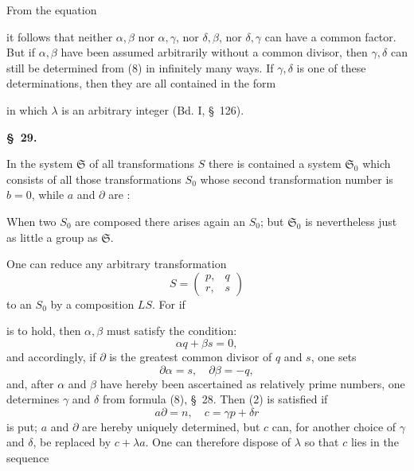 
From the equation


it follows that neither $\alpha, \beta$ nor $\alpha, \gamma$, nor $\delta, \beta$, nor $\delta, \gamma$ can have a common factor. But if $\alpha, \beta$ have been assumed arbitrarily without a common divisor, then $\gamma, \delta$ can still be determined from (8) in infinitely many ways. If $\gamma, \delta$ is one of these determinations, then they are all contained in the form


in which $\lambda$ is an arbitrary integer (Bd. I, \S\ 126).

\begin{center}
\textbf{\S\ 29.\quad{}}
\end{center}

In the system $\mathfrak{S}$ of all transformations $S$ there is contained a system $\mathfrak{S}_0$ which consists of all those transformations $S_0$ whose second transformation number is $b = 0$, while $a$ and $\partial$ are :


When two $S_0$ are composed there arises again an $S_0$; but $\mathfrak{S}_0$ is nevertheless just as little a group as $\mathfrak{S}$.

One can reduce any arbitrary transformation
\[
S = \begin{pmatrix} p, & q \\ r, & s \end{pmatrix}
\]
to an $S_0$ by a composition $LS$. For if


is to hold, then $\alpha, \beta$ must satisfy the condition:
\[
\alpha q + \beta s = 0,
\]
and accordingly, if $\partial$ is the greatest common divisor of $q$ and $s$, one sets
\[
\partial\alpha = s, \quad \partial\beta = -q,
\]
and, after $\alpha$ and $\beta$ have hereby been ascertained as relatively prime numbers, one determines $\gamma$ and $\delta$ from formula (8), \S\ 28. Then (2) is satisfied if
\[
a\partial = n, \quad c = \gamma p + \delta r
\]
is put; $a$ and $\partial$ are hereby uniquely determined, but $c$ can, for another choice of $\gamma$ and $\delta$, be replaced by $c+\lambda a$. One can therefore dispose of $\lambda$ so that $c$ lies in the sequence
